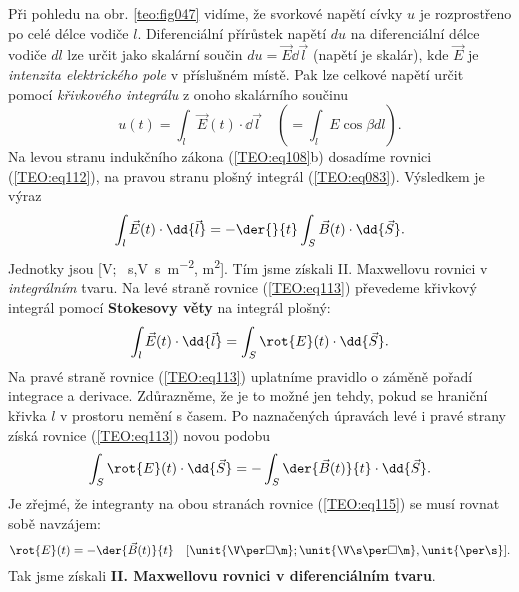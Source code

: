       Při pohledu na obr. \ref{teo:fig047} vidíme, že svorkové napětí cívky \(u\) je rozprostřeno po
      celé délce vodiče \(l\). Diferenciální přírůstek napětí \(du\) na diferenciální délce vodiče
      \(dl\) lze určit jako skalární součin \(du = \vec{E}\dd{\vec{l}}\) (napětí je skalár), kde
      \(\vec{E}\) je \emph{intenzita elektrického pole} v příslušném místě. Pak lze celkové napětí
      určit pomocí \emph{křivkového integrálu} z onoho skalárního součinu
      \begin{equation}\label{TEO:eq112}
        u(t) = \int_{l}\vec{E}(t)\cdot \dd{\vec{l}} \quad (=\int_lE\cos\beta dl).
      \end{equation}
      Na levou stranu indukčního zákona (\ref{TEO:eq108}b) dosadíme rovnici
      (\ref{TEO:eq112}), na pravou stranu plošný integrál (\ref{TEO:eq083}). Výsledkem
      je výraz
      \begin{equation}\label{TEO:eq113}
        \int_{l}\vec{E}(t)\cdot \dd{\vec{l}} = -\der{}{t}\int_{S}\vec{B}(t)\cdot \dd{\vec{S}}.
      \end{equation}
      Jednotky jsou [\unit{\V}; \unit{\per\s},\unit{\V\s\per\square\m}, \unit{\square\m}]. Tím jsme
      získali II. Maxwellovu rovnici v \emph{integrálním} tvaru. Na levé straně rovnice
      (\ref{TEO:eq113}) převedeme křivkový integrál pomocí \textbf{Stokesovy věty} na integrál
      plošný:
      \begin{equation*}
        \int_{l}\vec{E}(t)\cdot \dd{\vec{l}} = \int_{S}\rot{E}(t)\cdot \dd{\vec{S}}.
      \end{equation*}
      Na pravé straně rovnice (\ref{TEO:eq113}) uplatníme pravidlo o záměně pořadí integrace
      a derivace. Zdůrazněme, že je to možné jen tehdy, pokud se hraniční křivka \(l\) v prostoru
      nemění s časem. Po naznačených úpravách levé i pravé strany získá rovnice
      (\ref{TEO:eq113}) novou podobu
      \begin{equation}\label{TEO:eq115}
        \int_{S}\rot{E}(t)\cdot \dd{\vec{S}} = -\int_{S}\der{\vec{B}(t)}{t}\cdot \dd{\vec{S}}.
      \end{equation}
      Je zřejmé, že integranty na obou stranách rovnice (\ref{TEO:eq115}) se musí rovnat sobě
      navzájem:
      \begin{equation*}
        \rot{E}(t) = -\der{\vec{B}(t)}{t} \quad 
          [\unit{\V\per\square\m}; \unit{\V\s\per\square\m}, \unit{\per\s}].
      \end{equation*}
      Tak jsme získali \textbf{II. Maxwellovu rovnici v diferenciálním tvaru}.
      
